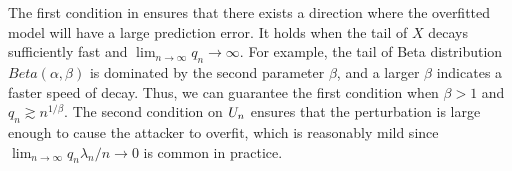         
        \begin{remark}
        The first condition in  ensures that there exists a direction where the overfitted model will have a large prediction error. It holds when the tail of $X$ decays sufficiently fast and $\lim_{n\to\infty} q_n \to \infty$. For example, the tail of Beta distribution $Beta(\alpha,\beta)$ is dominated by the second parameter $\beta$, and a larger $\beta$ indicates a faster speed of decay. Thus, we can guarantee the first condition when $\beta > 1$ and $q_n\gtrsim n^{1/\beta}$.
        The second condition on $U_n$ ensures that the perturbation is large enough to cause the attacker to overfit, which is reasonably mild since $\lim_{n\to\infty} q_n\lambda_n/n \to 0$ is common in practice. 
        \end{remark}
        


        
         


        